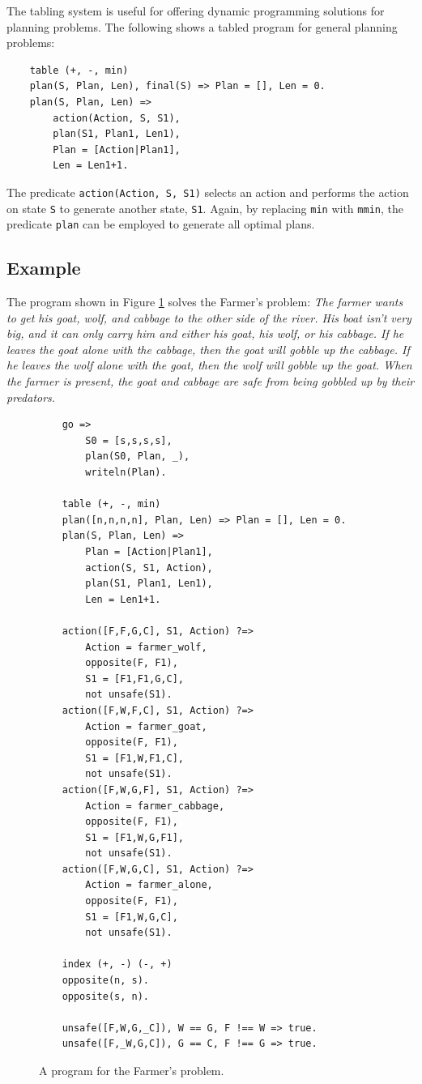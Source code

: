 The tabling system is useful for offering dynamic programming solutions for planning problems. The following shows a tabled program for general planning problems:
\begin{verbatim}
    table (+, -, min)
    plan(S, Plan, Len), final(S) => Plan = [], Len = 0.
    plan(S, Plan, Len) =>
        action(Action, S, S1),
        plan(S1, Plan1, Len1),
        Plan = [Action|Plan1],
        Len = Len1+1.
\end{verbatim}
The predicate \texttt{action(Action, S, S1)} selects an action and performs the action on state \texttt{S} to generate another state, \texttt{S1}. Again, by replacing \texttt{min} with \texttt{mmin}, the predicate \texttt{plan} can be employed to generate all optimal plans.

\subsection*{Example}
The program shown in Figure \ref{fig:farmer} solves the Farmer's problem: {\em The farmer wants to get his goat, wolf, and cabbage to the other side of the river. His boat isn't very big, and it can only carry him and either his goat, his wolf, or his cabbage. If he leaves the goat alone with the cabbage, then the goat will gobble up the cabbage. If he leaves the wolf alone with the goat, then the wolf will gobble up the goat. When the farmer is present, the goat and cabbage are safe from being gobbled up by their predators.}


\begin{figure}
\begin{center}
\begin{verbatim}
    go =>
        S0 = [s,s,s,s],
        plan(S0, Plan, _),
        writeln(Plan).

    table (+, -, min)
    plan([n,n,n,n], Plan, Len) => Plan = [], Len = 0.
    plan(S, Plan, Len) =>
        Plan = [Action|Plan1],
        action(S, S1, Action),
        plan(S1, Plan1, Len1),
        Len = Len1+1.
    
    action([F,F,G,C], S1, Action) ?=>
        Action = farmer_wolf,
        opposite(F, F1),
        S1 = [F1,F1,G,C],
        not unsafe(S1).
    action([F,W,F,C], S1, Action) ?=>
        Action = farmer_goat,
        opposite(F, F1),
        S1 = [F1,W,F1,C],
        not unsafe(S1).
    action([F,W,G,F], S1, Action) ?=>
        Action = farmer_cabbage,
        opposite(F, F1),
        S1 = [F1,W,G,F1],
        not unsafe(S1).
    action([F,W,G,C], S1, Action) ?=>
        Action = farmer_alone,
        opposite(F, F1),
        S1 = [F1,W,G,C],
        not unsafe(S1).

    index (+, -) (-, +)
    opposite(n, s).
    opposite(s, n).

    unsafe([F,W,G,_C]), W == G, F !== W => true.
    unsafe([F,_W,G,C]), G == C, F !== G => true.
\end{verbatim}
\end{center}
\caption{\label{fig:farmer}A program for the Farmer's problem.}
\end{figure}

